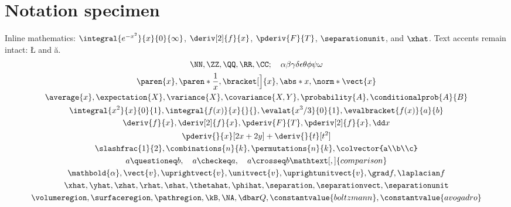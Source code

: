 \section*{Notation specimen}
Inline mathematics: $\integral{e^{-x^2}}{x}{0}{\infty}$,
$\deriv[2]{f}{x}$, $\pderiv{F}{T}$, $\separationunit$, and $\xhat$.
Text accents remain intact: \L{} and \u{a}.
\begin{gather*}
 \NN,\ZZ,\QQ,\RR,\CC;\quad \alpha\beta\gamma\delta\epsilon\theta\phi\psi\omega
 \\
 \paren{x},\paren*{\frac{1}{x}},\bracket[\Big]{x},\abs*{x},\norm*{\vect{x}}
 \\
 \average{x},\expectation{X},\variance{X},\covariance{X,Y},\probability{A},\conditionalprob{A}{B}
 \\
 \integral{x^2}{x}{0}{1},\integral{f(x)}{x}{}{},\evalat{x^3/3}{0}{1},\evalbracket{f(x)}{a}{b}
 \\
 \deriv{f}{x},\deriv[2]{f}{x},\pderiv{F}{T},\pderiv[2]{f}{x},\dd x
 \\
 \pderiv{}{x}[2x+2y] + \deriv{}{t}[t^2]
 \\
 \slashfrac{1}{2},\combinations{n}{k},\permutations{n}{k},\colvector{a\\b\\c}
 \\
 a\questioneq b,\quad a\checkeq a,\quad a\crosseq b\mathtext[,]{comparison}
 \\
 \mathbold{\alpha},\vect{v},\uprightvect{v},\unitvect{v},\uprightunitvect{v},\grad f,\laplacian f
 \\
 \xhat,\yhat,\zhat,\rhat,\shat,\thetahat,\phihat,\separation,\separationvect,\separationunit
 \\
 \volumeregion,\surfaceregion,\pathregion,\kB,\NA,\dbar Q,\constantvalue{boltzmann},\constantvalue{avogadro}
\end{gather*}
